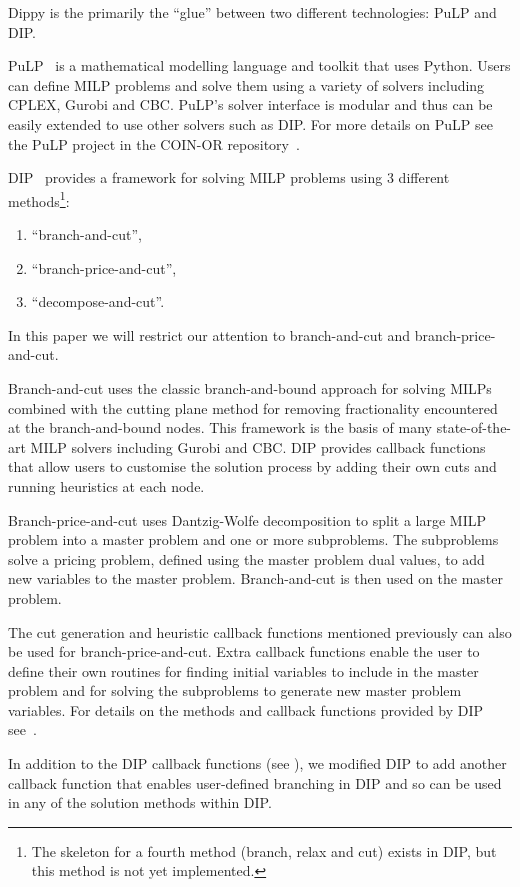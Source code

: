 Dippy is the primarily the ``glue'' between two different technologies: PuLP and DIP.

PuLP~\cite{pulp} is a mathematical modelling language and toolkit that uses Python.
Users can define \ac{MILP} problems and solve them using a variety of solvers including CPLEX, Gurobi and CBC.
PuLP's solver interface is modular and thus can be easily extended to use other solvers such as \ac{DIP}.
For more details on PuLP see the PuLP project in the COIN-OR repository~\cite{coin_or}.

\acf{DIP}~\cite{decomp04} provides a framework for solving \ac{MILP} problems using 3 different methods\footnote{The skeleton for a fourth method (branch, relax and cut) exists in \ac{DIP}, but this method is not yet implemented.}:
\begin{enumerate}
	\item ``branch-and-cut'',
	\item ``branch-price-and-cut'',
	\item ``decompose-and-cut''.
\end{enumerate}
In this paper we will restrict our attention to branch-and-cut and branch-price-and-cut.

Branch-and-cut uses the classic branch-and-bound approach for solving \ac{MILP}s combined with the cutting plane method for removing fractionality encountered at the branch-and-bound nodes.
This framework is the basis of many state-of-the-art \ac{MILP} solvers including Gurobi and CBC.
\ac{DIP} provides callback functions that allow users to customise the solution process by adding their own cuts and running heuristics at each node.

Branch-price-and-cut uses Dantzig-Wolfe decomposition to split a large \ac{MILP} problem into a master problem and one or more subproblems.
The subproblems solve a pricing problem, defined using the master problem dual values, to add new variables to the master problem.
Branch-and-cut is then used on the master problem.

The cut generation and heuristic callback functions mentioned previously can also be used for branch-price-and-cut.
Extra callback functions enable the user to define their own routines for finding initial variables to include in the master problem and for solving the subproblems to generate new master problem variables.
For details on the methods and callback functions provided by \ac{DIP} see~\cite{decomp04}.

In addition to the \ac{DIP} callback functions (see ), we modified DIP to add another callback function that enables user-defined branching in \ac{DIP} and so can be used in any of the solution methods within \ac{DIP}.

